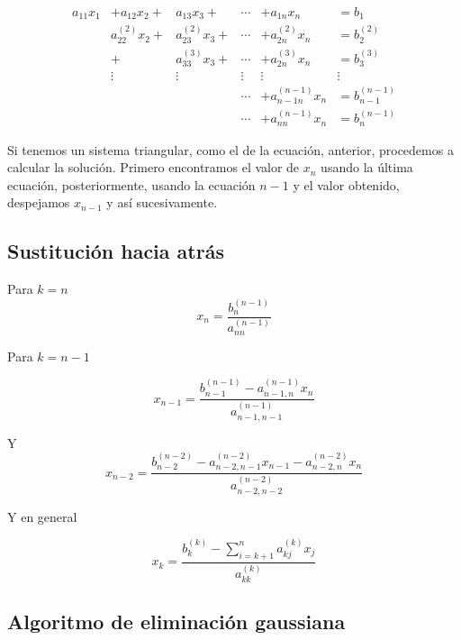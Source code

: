 \documentclass[
]{article}
\begin{document}
\begin{equation}
  \begin{matrix}
     a_{11} x_1 & +a_{12} x_2      + & a_{13}x_3 +      & \cdots   & +a_{1n} x_n        &= b_1  \\
                & a^{(2)}_{22} x_2 + & a^{(2)}_{23}x_3 +& \cdots   & +a^{(2)}_{2n} x_n  &= b^{(2)}_2\\
                &                  +& a^{(3)}_{33}x_3 +& \cdots    & +a^{(3)}_{2n} x_n  &= b^{(3)}_3\\
                & \vdots             & \vdots           & \vdots   &    \vdots          & \vdots\\
                &                    &                  & \cdots   & +a^{(n-1)}_{n-1n} x_n  & =b^{(n-1)}_{n-1}\\
                &                    &                  & \cdots   & +a^{(n-1)}_{nn} x_n  & =b^{(n-1)}_n
  \end{matrix}
\end{equation}

Si tenemos un sistema triangular, como el de la ecuación, anterior,
procedemos a calcular la solución. Primero encontramos el valor de
\(x_n\) usando la última ecuación, posteriormente, usando la ecuación
\(n-1\) y el valor obtenido, despejamos \(x_{n-1}\) y así sucesivamente.

\hypertarget{sustituciuxf3n-hacia-atruxe1s}{%
\subsection{Sustitución hacia
atrás}\label{sustituciuxf3n-hacia-atruxe1s}}

Para \(k =n\) \[
x_n = \frac{b^{(n-1)}_n}{a^{(n-1)}_{nn}}
\]

Para \(k=n-1\)

\[
x_{n-1} = \frac{b^{(n-1)}_{n-1} - a^{(n-1)}_{n-1,n}x_n}{a^{(n-1)}_{n-1,n-1}}
\]

Y \[
x_{n-2} = \frac{b^{(n-2)}_{n-2}- a^{(n-2)}_{n-2,n-1}x_{n-1} - a^{(n-2)}_{n-2,n}x_n}{a^{(n-2)}_{n-2,n-2}}
\]

Y en general

\[x_{k}=\frac{b^{(k)}_k-\sum_{i=k+1}^{n}a^{(k)}_{kj}x_j}{a^{(k)}_{kk}}\]

\hypertarget{algoritmo-de-eliminaciuxf3n-gaussiana}{%
\subsection{Algoritmo de eliminación
gaussiana}\label{algoritmo-de-eliminaciuxf3n-gaussiana}}
\end{document}
